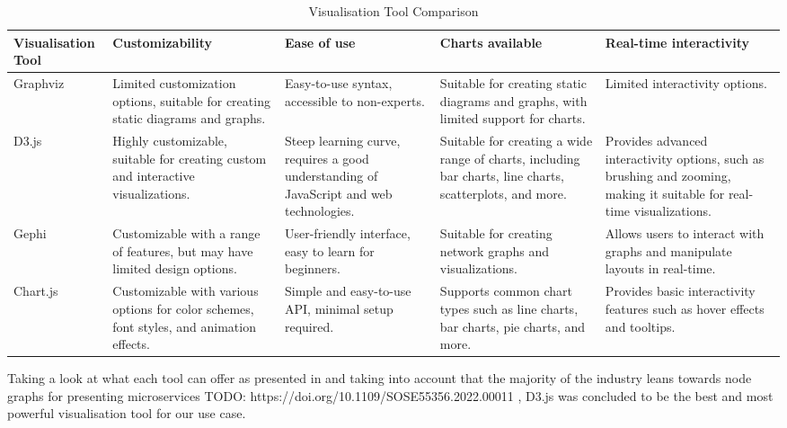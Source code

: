 \begin{table}[!htb] \caption{Visualisation Tool Comparison} \label{tab:visualisation_tool_comparison}
  \begin{center}
    \begin{tabular}[c]{p{8em}|p{8em}|p{8em}|p{8em}|p{8em}}
      \textbf{Visualisation Tool} &
      \textbf{Customizability} &
      \textbf{Ease of use} &
      \textbf{Charts available} &
      \textbf{Real-time interactivity} \\
      \hline Graphviz &
        Limited customization options, suitable for creating static diagrams and graphs. &
        Easy-to-use syntax, accessible to non-experts. &
        Suitable for creating static diagrams and graphs, with limited support for charts. &
        Limited interactivity options. \\
      \hline D3.js &
        Highly customizable, suitable for creating custom and interactive visualizations. &
        Steep learning curve, requires a good understanding of JavaScript and web technologies. &
        Suitable for creating a wide range of charts, including bar charts, line charts, scatterplots, and more. &
        Provides advanced interactivity options, such as brushing and zooming, making it suitable for real-time visualizations. \\
      \hline Gephi &
        Customizable with a range of features, but may have limited design options. &
        User-friendly interface, easy to learn for beginners. &
        Suitable for creating network graphs and visualizations. &
        Allows users to interact with graphs and manipulate layouts in real-time. \\
      \hline Chart.js &
        Customizable with various options for color schemes, font styles, and animation effects. &
        Simple and easy-to-use API, minimal setup required. &
        Supports common chart types such as line charts, bar charts, pie charts, and more. &
        Provides basic interactivity features such as hover effects and tooltips. \\
    \end{tabular}
  \end{center}
\end{table}

Taking a look at what each tool can offer as presented in  and taking into account that the majority of the industry leans towards node graphs for presenting microservices TODO: https://doi.org/10.1109/SOSE55356.2022.00011 , D3.js was concluded to be the best and most powerful visualisation tool for our use case.

